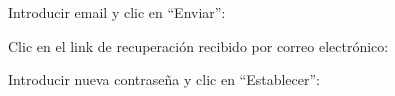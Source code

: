 \documentclass[12pt, spanish]{article}
\begin{document}
\begin{steps}
        \item Introducir email y clic en ``Enviar'':

            \medskip
            \begin{minipage}[t]{\linewidth}
            \raggedright
        \end{minipage}

        \item Clic en el link de recuperación recibido por correo electrónico:

            \medskip
            \begin{minipage}[t]{\linewidth}
            \raggedright
        \end{minipage}

        \item Introducir nueva contraseña y clic en ``Establecer'':


\end{steps}
\end{document}
